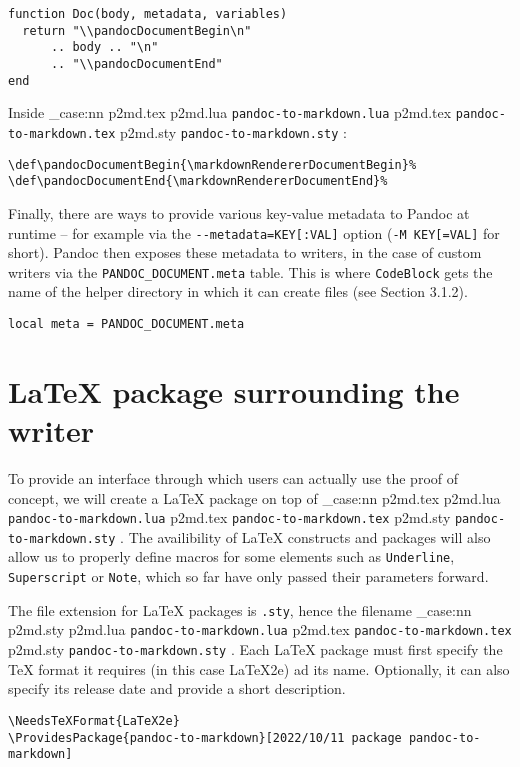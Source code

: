 \documentclass[
  digital,     %
  oneside,     %
  nosansbold,  %
  nocolorbold, %
  lof,         %
  nolot,       %
]{fithesis4}
\newcommand\file[1]
  {
    \str_case:nn
      { #1 }
      {
        { p2md.lua } { \texttt{pandoc\hyp{}to\hyp{}markdown.lua} }
        { p2md.tex } { \texttt{pandoc\hyp{}to\hyp{}markdown.tex} }
        { p2md.sty } { \texttt{pandoc\hyp{}to\hyp{}markdown.sty} }
      }
  }
\begin{document}
\noindent
\lstset{language=[5.3]Lua}
\begin{lstlisting}
function Doc(body, metadata, variables)
  return "\\pandocDocumentBegin\n"
      .. body .. "\n"
      .. "\\pandocDocumentEnd"
end
\end{lstlisting}

\noindent
Inside \file{p2md.tex}:

\noindent
\lstset{language=[plain]TeX}
\begin{lstlisting}
\def\pandocDocumentBegin{\markdownRendererDocumentBegin}%
\def\pandocDocumentEnd{\markdownRendererDocumentEnd}%
\end{lstlisting}

\noindent
Finally, there are ways to provide various key-value metadata to Pandoc at runtime -- for example via the \texttt{-{}-metadata=KEY[:VAL]} option (\texttt{-M KEY[=VAL]} for short). Pandoc then exposes these metadata to writers, in the case of custom writers via the \texttt{PANDOC\_DOCUMENT.meta} table. This is where \texttt{CodeBlock} gets the name of the helper directory in which it can create files (see Section 3.1.2).

\noindent
\lstset{language=[5.3]Lua}
\begin{lstlisting}
local meta = PANDOC_DOCUMENT.meta
\end{lstlisting}

\newpage
\section{\LaTeX{} package surrounding the writer}
To provide an interface through which users can actually use the proof of concept, we will create a \LaTeX{} package on top of \file{p2md.tex}. \cite{companion} The availibility of \LaTeX{} constructs and packages will also allow us to properly define macros for some elements such as \texttt{Underline}, \texttt{Superscript} or \texttt{Note}, which so far have only passed their parameters forward.

The file extension for \LaTeX{} packages is \texttt{.sty}, hence the filename \file{p2md.sty}.
Each \LaTeX{} package must first specify the \TeX{} format it requires (in this case \LaTeX{}2e) ad its name. Optionally, it can also specify its release date and provide a short description.

\noindent
\lstset{language=[LaTeX]TeX}
\begin{lstlisting}
\NeedsTeXFormat{LaTeX2e}
\ProvidesPackage{pandoc-to-markdown}[2022/10/11 package pandoc-to-markdown]
\end{lstlisting}
\end{document}
